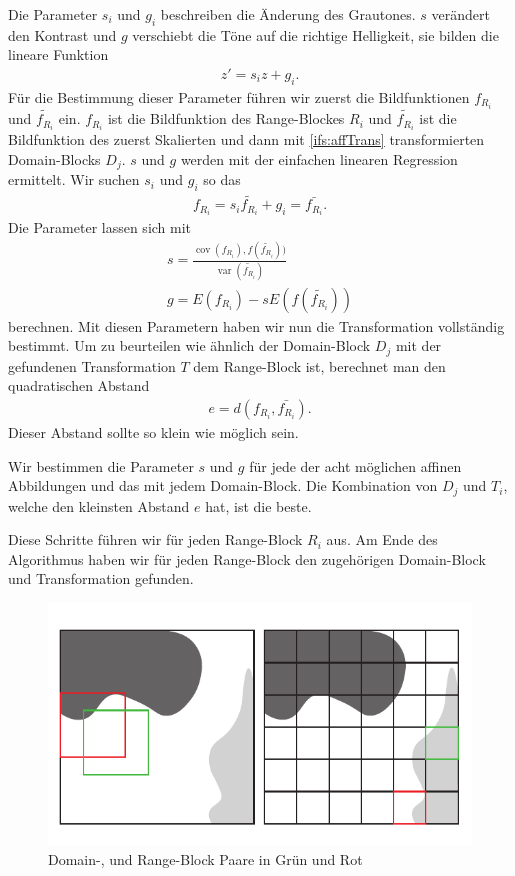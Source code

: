 Die Parameter $s_i$ und $g_i$ beschreiben die Änderung des Grautones. $s$ verändert den Kontrast und $g$ verschiebt die Töne auf die richtige Helligkeit, sie bilden die lineare Funktion
\begin{align*}
	z' = s_i z + g_i.
\end{align*}
Für die Bestimmung dieser Parameter führen wir zuerst die Bildfunktionen $f_{R_i}$ und $\tilde{f_{R_i}}$ ein.
$f_{R_i}$ ist die Bildfunktion des Range-Blockes $R_i$ und $\tilde{f_{R_i}}$ ist die Bildfunktion des zuerst Skalierten und dann mit \ref{ifs:affTrans} transformierten Domain-Blocks $D_j$.
$s$ und $g$ werden mit der einfachen linearen Regression ermittelt. 
Wir suchen $s_i$ und $g_i$ so das
\begin{align*}
	f_{R_i} = s_i \tilde{f_{R_i}} + g_i = \bar{f_{R_i}}.
\end{align*}
Die Parameter lassen sich mit
\begin{align*}	
	s = \frac{\operatorname{cov}(f_{R_i}), f(\tilde{f_{R_i}}))}{\operatorname{var}(\tilde{f_{R_i}})} \\
	g = E(f_{R_i}) - s E(f(\tilde{f_{R_i}}))
\end{align*}
berechnen.
Mit diesen Parametern haben wir nun die Transformation vollständig bestimmt.
Um zu beurteilen wie ähnlich der Domain-Block $D_j$ mit der gefundenen Transformation $T$ dem Range-Block ist, berechnet man den quadratischen Abstand
\begin{align*}
	e = d(f_{R_i}, \bar{f_{R_i}}).
\end{align*}
Dieser Abstand sollte so klein wie möglich sein.

Wir bestimmen die Parameter $s$ und $g$ für jede der acht möglichen affinen Abbildungen und das mit jedem Domain-Block.
Die Kombination von $D_j$ und $T_i$, welche den kleinsten Abstand $e$ hat, ist die beste.

Diese Schritte führen wir für jeden Range-Block $R_i$ aus.
Am Ende des Algorithmus haben wir für jeden Range-Block den zugehörigen Domain-Block und Transformation gefunden.

\begin{figure}	
	\centering
	\includegraphics[width=\textwidth]{papers/ifs/images/FIC}
	\caption{Domain-, und Range-Block Paare in Grün und Rot}
	\label{ifs:FIC}
\end{figure}

